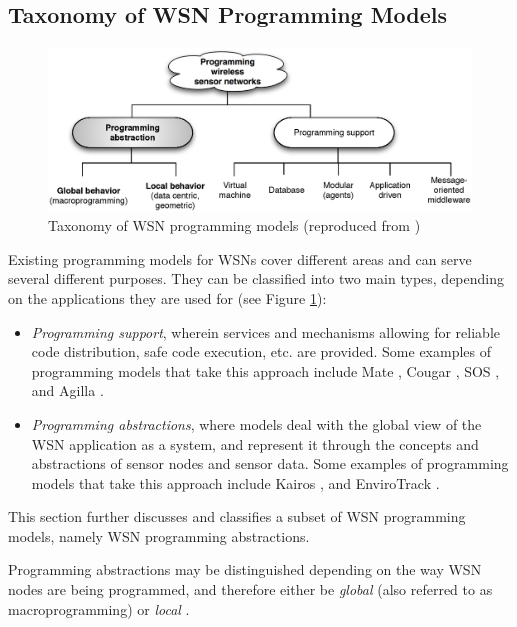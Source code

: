 \subsection{Taxonomy of WSN Programming Models}

\begin{figure}
\centering
\includegraphics[width=\textwidth]{img/ProgrammingAbstractions.eps} 
\caption[Taxonomy of WSN programming models]{Taxonomy of WSN programming models (reproduced from
\cite{hadim_middleware:2006})}
\label{Fig:ProgrammingModels}
\end{figure}

Existing programming models for WSNs cover different areas and can serve 
several different purposes. They can be classified into two main types, depending on 
the applications they are used for  \cite{hadim_middleware:2006} (see Figure
\ref{Fig:ProgrammingModels}):
\begin{itemize}
\item \emph{Programming support}, wherein services and mechanisms allowing for 
reliable code distribution, safe code execution, etc. are provided. Some
examples of programming models that take this approach include Mate
\cite{Levis_Mate:2002}, Cougar \cite{Bonnet_Cougar:2001}, SOS
\cite{Han_SOS:2005}, and Agilla \cite{Fok_Agilla:2005}.
\item \emph{Programming abstractions}, where models deal with the global view 
of the WSN application as a system, and represent it through the concepts and 
abstractions of sensor nodes and sensor data. Some
examples of programming models that take this approach include Kairos \cite{gummadi_Kairos:2005}, and
EnviroTrack \cite{Abdelzaher_EnviroTrack:2004}.
\end{itemize}

This section further discusses and classifies a subset of WSN programming
models, namely WSN programming abstractions.

Programming abstractions may be distinguished depending on the way WSN nodes
are being programmed, and therefore either be
\emph{global} (also referred to as macroprogramming) or \emph{local} \cite{hadim_middleware:2006}. 

